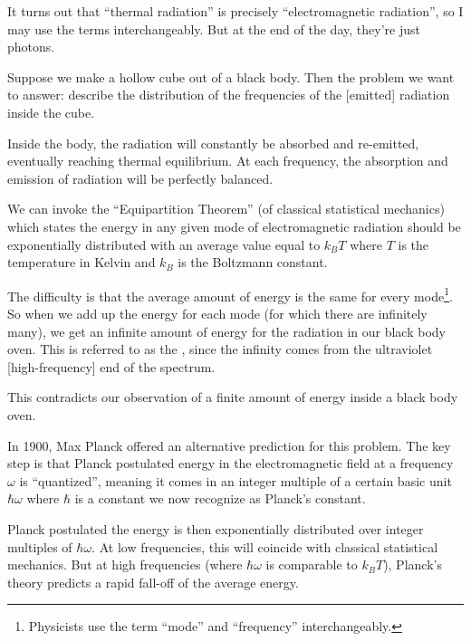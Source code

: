 \begin{remark}
It turns out that ``thermal radiation'' is precisely ``electromagnetic radiation'',
so I may use the terms interchangeably. But at the end of the day,
they're just photons.
\end{remark}

Suppose we make a hollow cube out of a black body. Then the problem we
want to answer: describe the distribution of the frequencies of the
[emitted] radiation inside the cube.

Inside the body, the radiation will constantly be absorbed and re-emitted,
eventually reaching thermal equilibrium.
At each frequency, the absorption and emission of radiation will be
perfectly balanced.

We can invoke the ``Equipartition Theorem'' (of classical statistical
mechanics) which states the energy in any given mode of electromagnetic
radiation should be exponentially distributed with an average value
equal to $k_{B}T$ where $T$ is the temperature in Kelvin and $k_{B}$ is
the Boltzmann constant.

The difficulty is that the average amount of energy is the same for
every mode\footnote{Physicists use the term ``mode'' and ``frequency''
interchangeably.}. So when we add up the energy for each mode (for which
there are infinitely many), we get an infinite amount of energy for the
radiation in our black body oven. This is referred to as the
, since the infinity comes from the
ultraviolet [high-frequency] end of the spectrum.

This contradicts our observation of a finite amount of energy inside a
black body oven.

In 1900, Max Planck offered an alternative prediction for this problem. The
key step is that Planck postulated energy in the electromagnetic field
at a frequency $\omega$ is ``quantized'', meaning it comes in an integer
multiple of a certain basic unit $\hbar\omega$ where $\hbar$ is a
constant we now recognize as Planck's constant.

Planck postulated the energy is then exponentially distributed over
integer multiples of $\hbar\omega$. At low frequencies, this will
coincide with classical statistical mechanics. But at high frequencies
(where $\hbar\omega$ is comparable to $k_{B}T$), Planck's theory
predicts a rapid fall-off of the average energy.

